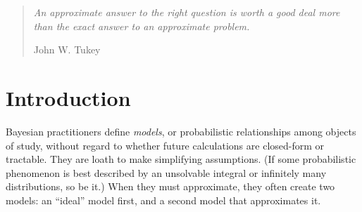 \begin{comment}
TODO LIST

* Use := for definitions and ::= for grammars

\end{comment}



\begin{quote}
\textit{An approximate answer to the right question is worth a good deal more than the exact answer to an approximate problem.}

\hfill John W. Tukey
\end{quote}

\begin{comment}
\begin{abstract}
Bayesian practitioners build models of the world without regarding how difficult it will be to answer questions about them. When answering questions, they put off approximating as long as possible, and usually must write programs to compute converging approximations. Writing the programs is distracting, tedious and error-prone, and we wish to relieve them of it by providing languages and compilers.

Their style constrains our work: the tools we provide cannot approximate early. Our approach to meeting this constraint is to 1) determine their notation's meaning in a suitable theoretical framework; 2) generalize our interpretation in an uncomputable, \textit{exact} semantics; 3) \textit{approximate} the exact semantics and prove convergence; and 4) implement the approximating semantics in Racket (formerly PLT Scheme). In this way, we define languages with at least as much exactness as Bayesian practitioners have in mind, and also put off approximating as long as possible.

In this paper, we demonstrate the approach using our preliminary work on discrete (countably infinite) Bayesian models.

\keywords{Semantics, Domain-specific languages, Probability theory}
\end{abstract}
\end{comment}

\section{Introduction}

Bayesian practitioners define \textit{models}, or probabilistic relationships among objects of study, without regard to whether future calculations are closed-form or tractable. They are loath to make simplifying assumptions.
(If some probabilistic phenomenon is best described by an unsolvable integral or infinitely many distributions, so be it.)
When they must approximate, they often create two models: an ``ideal'' model first, and a second model that approximates it.

